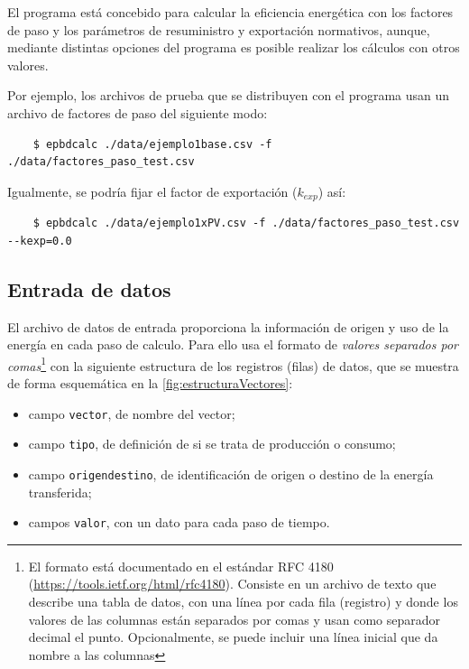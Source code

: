 \documentclass[10pt,notitlepage,oneside,a4paper]{article}
\begin{document}
El programa está concebido para calcular la eficiencia energética con los factores de paso y los parámetros de resuministro y exportación normativos, aunque, mediante distintas opciones del programa es posible realizar los cálculos con otros valores.

Por ejemplo, los archivos de prueba que se distribuyen con el programa usan un archivo de factores de paso del siguiente modo:

\begin{Verbatim}
	$ epbdcalc ./data/ejemplo1base.csv -f ./data/factores_paso_test.csv 
\end{Verbatim}

Igualmente, se podría fijar el factor de exportación ($k_{exp}$) así:

\begin{Verbatim}
	$ epbdcalc ./data/ejemplo1xPV.csv -f ./data/factores_paso_test.csv --kexp=0.0
\end{Verbatim}

\subsection{Entrada de datos}

El archivo de datos de entrada proporciona la información de origen y uso de la energía en cada paso de calculo. Para ello usa el formato de \textit{valores separados por comas}\footnote{El formato está documentado en el estándar RFC 4180 (\url{https://tools.ietf.org/html/rfc4180}). Consiste en un archivo de texto que describe una tabla de datos, con una línea por cada fila (registro) y donde los valores de las columnas están separados por comas y usan como separador decimal el punto. Opcionalmente, se puede incluir una línea inicial que da nombre a las columnas} con la siguiente estructura de los registros (filas) de datos, que se muestra de forma esquemática en la \autoref{fig:estructuraVectores}:

\begin{itemize}
\item campo \texttt{vector}, de nombre del vector;
\item campo \texttt{tipo}, de definición de si se trata de producción o consumo;
\item campo \texttt{origendestino}, de identificación de origen o destino de la energía transferida;
\item campos \texttt{valor}, con un dato para cada paso de tiempo.
\end{itemize}
\end{document}

